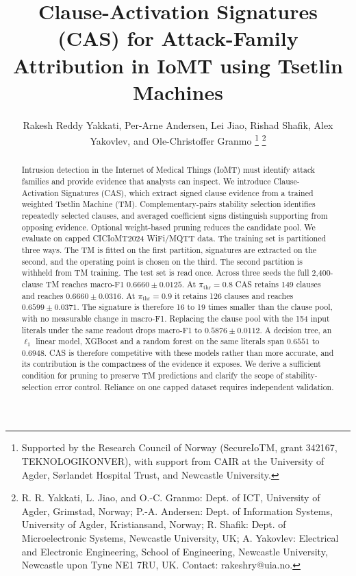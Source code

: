 \documentclass[conference]{IEEEtran}
\begin{document}
\title{Clause-Activation Signatures (CAS) for Attack-Family Attribution in IoMT using Tsetlin Machines}

\author{{\small Rakesh Reddy Yakkati, Per-Arne Andersen, Lei Jiao, Rishad Shafik, Alex Yakovlev, and Ole-Christoffer Granmo}
\thanks{Supported by the Research Council of Norway (SecureIoTM, grant 342167, TEKNOLOGIKONVER), with support from CAIR at the University of Agder, S\o rlandet Hospital Trust, and Newcastle University.}%
\thanks{R. R. Yakkati, L. Jiao, and O.-C. Granmo: Dept. of ICT, University of Agder, Grimstad, Norway; P.-A. Andersen: Dept. of Information Systems, University of Agder, Kristiansand, Norway; R. Shafik: Dept. of Microelectronic Systems, Newcastle University, UK; A. Yakovlev: Electrical and Electronic Engineering, School of Engineering, Newcastle University, Newcastle upon Tyne NE1 7RU, UK. Contact: rakeshry@uia.no.}}

\maketitle

\begin{abstract}
Intrusion detection in the Internet of Medical Things (IoMT) must
identify attack families and provide evidence that analysts can inspect.
We introduce Clause-Activation Signatures (CAS), which extract signed
clause evidence from a trained weighted Tsetlin Machine (TM).
Complementary-pairs stability selection identifies repeatedly selected
clauses, and averaged coefficient signs distinguish supporting from
opposing evidence. Optional weight-based pruning reduces the candidate
pool. We evaluate on capped CICIoMT2024 WiFi/MQTT data. The training
set is partitioned three ways. The TM is fitted on the first partition,
signatures are extracted on the second, and the operating point is
chosen on the third. The second partition is withheld from TM training.
The test set is read once. Across three seeds the full 2,400-clause TM
reaches macro-F1 $0.6660\pm0.0125$. At $\pi_{\mathrm{thr}}=0.8$ CAS
retains 149 clauses and reaches $0.6660\pm0.0316$. At
$\pi_{\mathrm{thr}}=0.9$ it retains 126 clauses and reaches
$0.6599\pm0.0371$. The signature is therefore 16 to 19 times smaller
than the clause pool, with no measurable change in macro-F1. Replacing
the clause pool with the 154 input literals under the same readout
drops macro-F1 to $0.5876\pm0.0112$. A decision tree, an $\ell_1$
linear model, XGBoost and a random forest on the same literals span
$0.6551$ to $0.6948$. CAS is therefore competitive with these models
rather than more accurate, and its contribution is the compactness of
the evidence it exposes. We derive a sufficient condition for pruning to
preserve TM predictions and clarify the scope of stability-selection
error control. Reliance on one capped dataset requires independent
validation.
\end{abstract}
\end{document}
